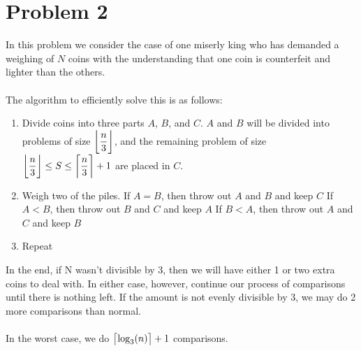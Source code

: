 \section*{Problem 2}

In this problem we consider the case of one miserly king who has 
demanded a weighing of $N$ coins with the understanding that one coin
is counterfeit and lighter than the others. 
\\
\\
The algorithm to efficiently solve this is as follows:
\begin{enumerate}[noitemsep]
    \item Divide coins into three parts $A$, $B$, and $C$. $A$ and $B$
          will be divided into problems of size $\floor[\bigg]{\dfrac{n}{3}}$, and the remaining problem of size $\floor[\bigg]{\dfrac{n}{3}} \leq S \leq \ceil[\bigg]{\dfrac{n}{3}} + 1$ are placed in $C$.
    \item Weigh two of the piles.
    \subitem If $A = B$,  then throw out $A$ and $B$ and keep $C$
    \subitem If $A < B$, then throw out $B$ and $C$ and keep $A$
    \subitem If $B < A$, then throw out $A$ and $C$ and keep $B$
    \item Repeat
\end{enumerate} 

In the end, if N wasn't divisible by 3, then we will have either 1 or two extra coins to deal with. In either case, however, continue our process of comparisons until there is nothing left. If the amount is not evenly divisible by 3, we may do 2 more comparisons than normal.
\\
\\
In the worst case, we do $\ceil[\big]{\log_3(n)} + 1$ comparisons.